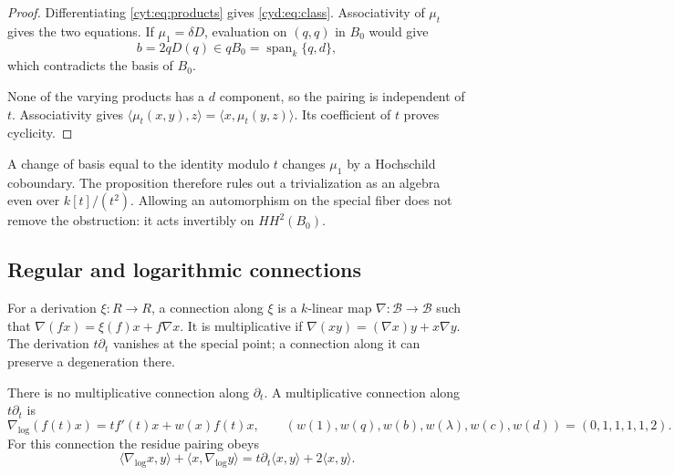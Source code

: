 \begin{proof}
Differentiating \eqref{cyt:eq:products} gives
\eqref{cyd:eq:class}. Associativity of \(\mu_t\) gives the
two equations. If \(\mu_1=\delta D\), evaluation on \((q,q)\)
in \(B_0\) would give
\[
          b=2qD(q)\in qB_0=\operatorname{span}_k\{q,d\},
\]
which contradicts the basis of \(B_0\).

None of the varying products has a \(d\) component, so the
pairing is independent of \(t\). Associativity gives
\(\langle\mu_t(x,y),z\rangle=\langle x,\mu_t(y,z)\rangle\).
Its coefficient of \(t\) proves cyclicity.
\end{proof}

A change of basis equal to the identity modulo \(t\) changes
\(\mu_1\) by a Hochschild coboundary. The proposition therefore
rules out a trivialization as an algebra even over \(k[t]/(t^2)\).
Allowing an automorphism on the special fiber does not remove
the obstruction: it acts invertibly on \(HH^2(B_0)\).

\subsection{Regular and logarithmic connections}

For a derivation \(\xi:R\to R\), a connection along \(\xi\)
is a \(k\)-linear map \(\nabla:\mathcal B\to\mathcal B\)
such that \(\nabla(fx)=\xi(f)x+f\nabla x\).
It is multiplicative if
\(\nabla(xy)=(\nabla x)y+x\nabla y\).
The derivation \(t\partial_t\) vanishes at the special point;
a connection along it can preserve a degeneration there.

\begin{proposition}\label{cyd:prop:connection}
There is no multiplicative connection along \(\partial_t\).
A multiplicative connection along \(t\partial_t\) is
\begin{equation}\label{cyd:eq:logarithmic}
 \nabla_{\log}(f(t)x)=tf'(t)x+w(x)f(t)x,
 \qquad
 (w(1),w(q),w(b),w(\lambda),w(c),w(d))=(0,1,1,1,1,2).
\end{equation}
For this connection the residue pairing obeys
\[
 \langle\nabla_{\log}x,y\rangle+
 \langle x,\nabla_{\log}y\rangle
      =t\partial_t\langle x,y\rangle+2\langle x,y\rangle.
\]
\end{proposition}

